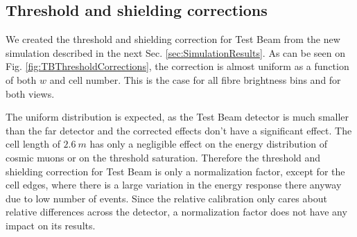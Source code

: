 \subsection{Threshold and shielding corrections}
We created the threshold and shielding correction for Test Beam from the new simulation described in the next Sec. \ref{sec:SimulationResults}. As can be seen on Fig. \ref{fig:TBThresholdCorrections}, the correction is almost uniform as a function of both $w$ and cell number. This is the case for all fibre brightness bins and for both views.

The uniform distribution is expected, as the Test Beam detector is much smaller than the far detector and the corrected effects don't have a significant effect. The cell length of $2.6\ \unit{m}$ has only a negligible effect on the energy distribution of cosmic muons or on the threshold saturation. Therefore the threshold and shielding correction for Test Beam is only a normalization factor, except for the cell edges, where there is a large variation in the energy response there anyway due to low number of events. Since the relative calibration only cares about relative differences across the detector, a normalization factor does not have any impact on its results.

